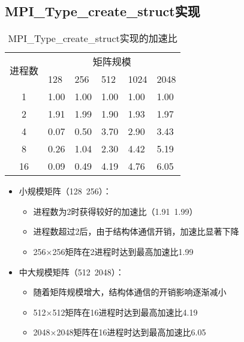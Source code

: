 \documentclass{SYSUReport}
\begin{document}
\subsection{MPI\_Type\_create\_struct实现}
\begin{table}[H]
\centering
\caption{MPI\_Type\_create\_struct实现的加速比}
\label{表4}
\begin{tabular}{|c|lllll|}
\hline
\multirow{2}{*}{进程数} & \multicolumn{5}{c|}{矩阵规模}                                                                        \\ \cline{2-6} 
 & \multicolumn{1}{l|}{128} & \multicolumn{1}{l|}{256} & \multicolumn{1}{l|}{512} & \multicolumn{1}{l|}{1024} & 2048 \\ \hline
1                    & \multicolumn{1}{l|}{1.00} & \multicolumn{1}{l|}{1.00} & \multicolumn{1}{l|}{1.00} & \multicolumn{1}{l|}{1.00} & 1.00 \\ \hline
2                    & \multicolumn{1}{l|}{1.91} & \multicolumn{1}{l|}{1.99} & \multicolumn{1}{l|}{1.90} & \multicolumn{1}{l|}{1.93} & 1.97 \\ \hline
4                    & \multicolumn{1}{l|}{0.07} & \multicolumn{1}{l|}{0.50} & \multicolumn{1}{l|}{3.70} & \multicolumn{1}{l|}{2.90} & 3.43 \\ \hline
8                    & \multicolumn{1}{l|}{0.26} & \multicolumn{1}{l|}{1.04} & \multicolumn{1}{l|}{2.30} & \multicolumn{1}{l|}{4.42} & 5.19 \\ \hline
16                   & \multicolumn{1}{l|}{0.09} & \multicolumn{1}{l|}{0.49} & \multicolumn{1}{l|}{4.19} & \multicolumn{1}{l|}{4.76} & 6.05 \\ \hline
\end{tabular}
\end{table}

\begin{itemize}
    \item 小规模矩阵（128~256）：
    \begin{itemize}
        \item 进程数为2时获得较好的加速比（1.91~1.99）
        \item 进程数超过2后，由于结构体通信开销，加速比显著下降
        \item 256×256矩阵在2进程时达到最高加速比1.99
    \end{itemize}
    \item 中大规模矩阵（512~2048）：
    \begin{itemize}
        \item 随着矩阵规模增大，结构体通信的开销影响逐渐减小
        \item 512×512矩阵在16进程时达到最高加速比4.19
        \item 2048×2048矩阵在16进程时达到最高加速比6.05
    \end{itemize}
\end{itemize}
\end{document}
